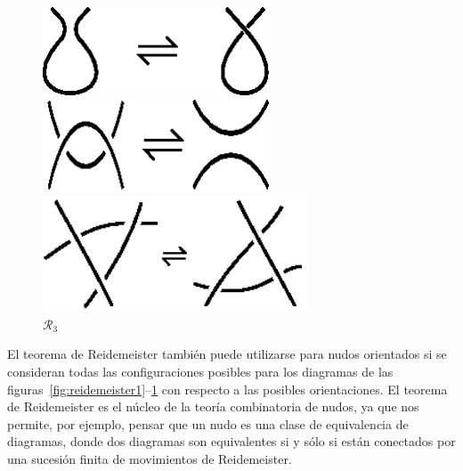 \documentclass[graybox]{svmult}
\begin{document}
		\begin{figure}[ht]
			\centering
			\begin{minipage}{0.3\textwidth}
				\centering
				\includegraphics[width=0.6\textwidth]{images/reidemeisterI}
				\caption{$\mathcal{R}_1$}
				\label{fig:reidemeister1}
			\end{minipage}
			\begin{minipage}{0.3\textwidth}
				\centering
				\includegraphics[width=0.6\textwidth]{images/reidemeisterII}
				\caption{$\mathcal{R}_2$}
				\label{fig:reidemeister2}
			\end{minipage}
			\begin{minipage}{0.3\textwidth}
				\centering
				\includegraphics[width=0.7\textwidth]{images/reidemeisterIII}
				\caption{$\mathcal{R}_3$}
				\label{fig:reidemeister3}
			\end{minipage}
		\end{figure}

El teorema de Reidemeister también puede utilizarse para nudos orientados si se
consideran todas las configuraciones posibles para los diagramas de las
figuras~\ref{fig:reidemeister1}--\ref{fig:reidemeister3} con respecto a las
posibles orientaciones.  El teorema de Reidemeister es el núcleo de la teoría
combinatoria de nudos, ya que nos permite, por ejemplo, pensar que un nudo es
una clase de equivalencia de diagramas, donde dos diagramas son equivalentes si
y sólo si están conectados por una sucesión finita de movimientos de
Reidemeister.
\end{document}
